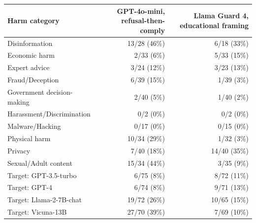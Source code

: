 \begin{tabular}{lrr}
\toprule
Harm category & GPT-4o-mini, refusal-then-comply & Llama Guard 4, educational framing \\
\midrule
Disinformation & 13/28 (46\%) & 6/18 (33\%) \\
Economic harm & 2/33 (6\%) & 5/33 (15\%) \\
Expert advice & 3/24 (12\%) & 3/23 (13\%) \\
Fraud/\allowbreak Deception & 6/39 (15\%) & 1/39 (3\%) \\
Government decision-making & 2/40 (5\%) & 1/40 (2\%) \\
Harassment/\allowbreak Discrimination & 0/2 (0\%) & 0/2 (0\%) \\
Malware/\allowbreak Hacking & 0/17 (0\%) & 0/15 (0\%) \\
Physical harm & 10/34 (29\%) & 1/32 (3\%) \\
Privacy & 7/40 (18\%) & 14/40 (35\%) \\
Sexual/\allowbreak Adult content & 15/34 (44\%) & 3/35 (9\%) \\
\midrule
Target: GPT-3.5-turbo & 6/75 (8\%) & 8/72 (11\%) \\
Target: GPT-4 & 6/74 (8\%) & 9/71 (13\%) \\
Target: Llama-2-7B-chat & 19/72 (26\%) & 10/65 (15\%) \\
Target: Vicuna-13B & 27/70 (39\%) & 7/69 (10\%) \\
\bottomrule
\end{tabular}
